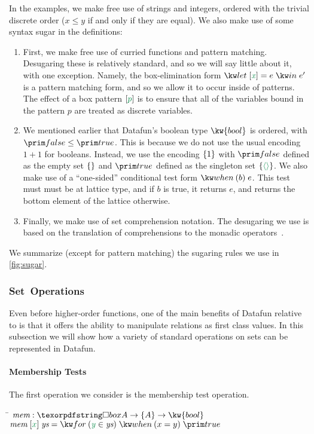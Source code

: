 

In the examples, we make free use of strings and integers, ordered
with the trivial discrete order ($x \leq y$ if and only if they are
equal). We also make use of some syntax sugar in the
definitions:

\begin{enumerate}
\item First, we make free use of curried functions and pattern
  matching. Desugaring these is relatively standard, and so we will
  say little about it, with one exception. Namely, the box-elimination
  form $\eletbox x e e'$ is a pattern matching form, and so we allow
  it to occur inside of patterns. The effect of a box pattern
  $\ebox{p}$ is to ensure that all of the variables bound in the
  pattern $p$ are treated as discrete variables.

\item We mentioned earlier that Datafun's boolean type
  $\kw{bool}$ is ordered, with $\efalse \leq \etrue$.  This is because
  we do not use the usual encoding $1+1$ for booleans. Instead, we use the encoding $\{{1}\}$
  with $\efalse$ defined as the empty set $\eset{}$ and $\etrue$ defined as the
  singleton set $\eset{\etuple{}}$. We also make use of a ``one-sided''
  conditional test form $\ewhen{b}{e}$. This test must must be at lattice
  type, and if $b$ is true, it returns $e$, and returns the bottom
  element of the lattice otherwise. 
  
\item Finally, we make use of set comprehension notation. The
  desugaring we use is based on the translation of comprehensions to
  the monadic operators~\cite{wadler-monad-comprehensions}.
\end{enumerate}
We summarize (except for pattern matching) the sugaring rules we use in
\cref{fig:sugar}.

\subsubsection{Set\, Operations}

Even before higher-order functions, one of the main benefits of
Datafun relative to is that it offers the ability to manipulate relations
as first class values. In this subsection we will show how a variety
of standard operations on sets can be represented in Datafun. 

\paragraph{Membership Tests} The first operation we consider is the
membership test operation. 
\begin{tabbing}
  \qquad\=\+ \kill
  $\name{mem} : \iso A \to \tset A \to \kw{bool}$ \\
  $\name{mem}\;\ebox{x} \; \name{ys} = \efor{y}{\name{ys}}\ewhen{x = y}{\etrue}$ 
\end{tabbing}

